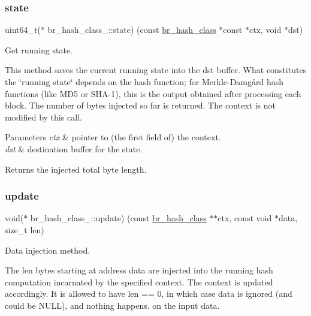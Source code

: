\subsubsection{\texorpdfstring{state}{state}}
{\footnotesize\ttfamily uint64\+\_\+t($\ast$ br\+\_\+hash\+\_\+class\+\_\+\+::state) (const \hyperlink{bearssl__hash_8h_ae38c1b9d539537cc16fc84388b922d86}{br\+\_\+hash\+\_\+class} $\ast$const $\ast$ctx, void $\ast$dst)}



Get running state. 

This method saves the current running state into the {\ttfamily dst} buffer. What constitutes the \char`\"{}running state\char`\"{} depends on the hash function; for Merkle-\/\+Damgård hash functions (like M\+D5 or S\+H\+A-\/1), this is the output obtained after processing each block. The number of bytes injected so far is returned. The context is not modified by this call.


\begin{DoxyParams}{Parameters}
{\em ctx} & pointer to (the first field of) the context. \\
\hline
{\em dst} & destination buffer for the state. \\
\hline
\end{DoxyParams}
\begin{DoxyReturn}{Returns}
the injected total byte length. 
\end{DoxyReturn}
\mbox{\label{structbr__hash__class___a5f8725811995c5064c87939c1957547e}} 
\subsubsection{\texorpdfstring{update}{update}}
{\footnotesize\ttfamily void($\ast$ br\+\_\+hash\+\_\+class\+\_\+\+::update) (const \hyperlink{bearssl__hash_8h_ae38c1b9d539537cc16fc84388b922d86}{br\+\_\+hash\+\_\+class} $\ast$$\ast$ctx, const void $\ast$data, size\+\_\+t len)}



Data injection method. 

The {\ttfamily len} bytes starting at address {\ttfamily data} are injected into the running hash computation incarnated by the specified context. The context is updated accordingly. It is allowed to have {\ttfamily len == 0}, in which case {\ttfamily data} is ignored (and could be {\ttfamily N\+U\+LL}), and nothing happens. on the input data.


